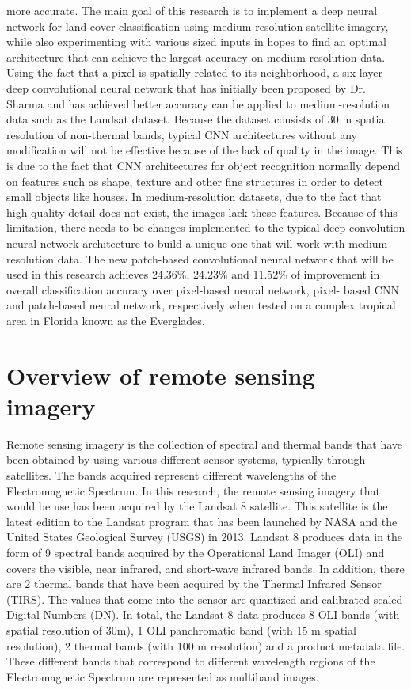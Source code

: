 \documentclass[letterpaper, 10 pt, conference]{ieeeconf}  %
\begin{document}
more accurate. The main goal of this research is to implement a deep neural network for land cover classification using medium-resolution satellite imagery, while also experimenting with various sized inputs in hopes to find an optimal architecture that can achieve the largest accuracy on medium-resolution data. Using the fact that a pixel is spatially related to its neighborhood, a six-layer deep convolutional neural network that has initially been proposed by Dr. Sharma and has achieved better accuracy can be applied to medium-resolution data such as the Landsat dataset. Because the dataset consists of 30 m spatial resolution of non-thermal bands, typical CNN architectures without any modification will not be effective because of the lack of quality in the image. This is due to the fact that CNN architectures for object recognition normally depend on features such as shape, texture and other fine structures in order to detect small objects like houses. In medium-resolution datasets, due to the fact that high-quality detail does not exist, the images lack these features. Because of this limitation, there needs to be changes implemented to the typical deep convolution neural network architecture to build a unique one that will work with medium-resolution data. The new patch-based convolutional neural network that will be used in this research achieves 24.36\%, 24.23\% and 11.52\% of improvement in overall classification accuracy over pixel-based neural network, pixel- based CNN and patch-based neural network, respectively when tested on a complex tropical area in Florida known as the Everglades.


\section{Overview of remote sensing imagery}


Remote sensing imagery is the collection of spectral and thermal bands that have been obtained by using various different sensor systems, typically through satellites. The bands acquired represent different wavelengths of the Electromagnetic Spectrum. In this research, the remote sensing imagery that would be use has been acquired by the Landsat 8 satellite. This satellite is the latest edition to the Landsat program that has been launched by NASA and the United States Geological Survey (USGS) in 2013. Landsat 8 produces data in the form of 9 spectral bands acquired by the Operational Land Imager (OLI) and covers the visible, near infrared, and short-wave infrared bands. In addition, there are 2 thermal bands that have been acquired by the Thermal Infrared Sensor (TIRS). The values that come into the sensor are quantized and calibrated scaled Digital Numbers (DN). In total, the Landsat 8 data produces 8 OLI bands (with spatial resolution of 30m), 1 OLI panchromatic band (with 15 m spatial resolution), 2 thermal bands (with 100 m resolution) and a product metadata file. These different bands that correspond to different wavelength regions of the Electromagnetic Spectrum are represented as multiband images.
\end{document}
